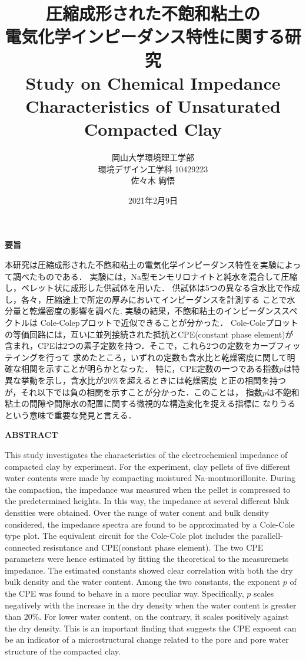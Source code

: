 \documentclass[11pt,a4j]{mybook2}
\title{
\vspace{20mm}
圧縮成形された不飽和粘土の\\
電気化学インピーダンス特性に関する研究
\\
\vspace{5mm}
Study on Chemical Impedance Characteristics 
of Unsaturated Compacted Clay
\vspace{60mm}
}
\date{2021年2月9日}
\author{
	\vspace{40mm}
岡山大学環境理工学部\\
環境デザイン工学科 10429223\\
	佐々木 絢悟
}
\begin{document}
\maketitle
\begin{center}
\begin{minipage}{15cm}
\begin{center}
	{\bf 要旨}
\end{center}
本研究は圧縮成形された不飽和粘土の電気化学インピーダンス特性を実験によって調べたものである．
実験には，Na型モンモリロナイトと純水を混合して圧縮し，ペレット状に成形した供試体を用いた．
供試体は5つの異なる含水比で作成し，各々，圧縮途上で所定の厚みにおいてインピーダンスを計測する
ことで水分量と乾燥密度の影響を調べた. 実験の結果，不飽和粘土のインピーダンススペクトルは
Cole-Colepプロットで近似できることが分かった．
Cole-Coleプロットの等価回路には，互いに並列接続された抵抗とCPE(constant phase element)が
含まれ，CPEは2つの素子定数を持つ．そこで，これら2つの定数をカーブフィッテイングを行って
求めたところ，いずれの定数も含水比と乾燥密度に関して明確な相関を示すことが明らかとなった．
特に，CPE定数の一つである指数$p$は特異な挙動を示し，含水比が$20\%$を超えるときには乾燥密度
と正の相関を持つが，それ以下では負の相関を示すことが分かった．このことは，
指数$p$は不飽和粘土の間隙や間隙水の配置に関する微視的な構造変化を捉える指標に
なりうるという意味で重要な発見と言える．
	\vspace{15mm}
\begin{center}
	{\bf ABSTRACT}
\end{center}
This study investigates the characteristics of the electrochemical impedance of compacted clay by experiment.
For the experiment, clay pellets of five different water contents were made by compacting moistured Na-montmorillonite.
During the compaction, the impedance was measured when the pellet is compressed to the predetermined heights. 
In this way, the impedance at several different bluk densities were obtained.
Over the range of water conent and bulk density considered,  the impedance spectra are found to be 
approximated by a Cole-Cole type plot. The equivalent circuit for the Cole-Cole plot includes the parallell-connected 
resisntance and CPE(constant phase element). The two CPE parameters were hence estimated by fitting the theoretical 
to the measuremets impedance. The estimated constants showed clear correlation with both the dry bulk density 
and the water content. Among the two constants, the exponent $p$ of the CPE was found to behave in a more peculiar way. 
Specifically, $p$ scales negatively with the increase in the dry density when the water content is greater than 20\%. 
For lower water content, on the contrary, it scales positively against the dry density. 
This is an important finding that suggests the CPE expoent can be an indicator of a microstructural change 
related to the pore and pore water structure of the compacted clay.
\end{minipage}
\end{center}
\tableofcontents
\frontmatter
\mainmatter
\end{document}
